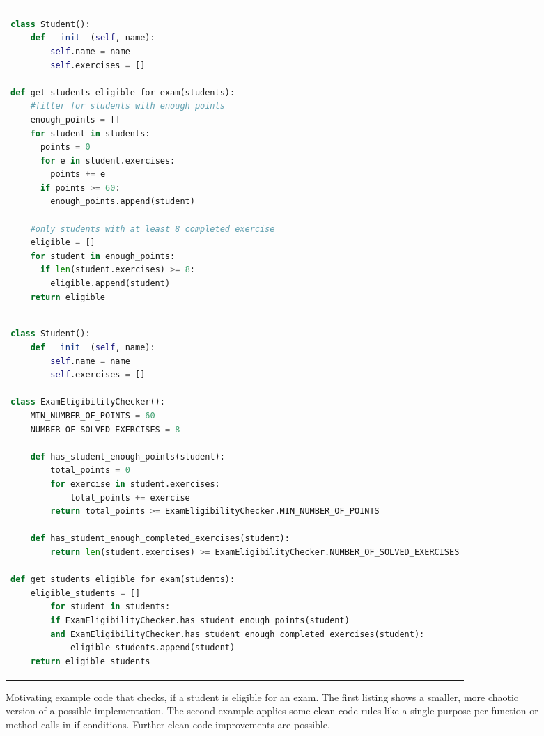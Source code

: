 \begin{figure}[h]
\begin{tabular}{p{\textwidth}}
\begin{minipage}{1\textwidth}
\centering
\begin{lstlisting}[basicstyle=\tiny, language=Python, label=lst:tokens_1, caption={}]
class Student():
    def __init__(self, name):
        self.name = name
        self.exercises = []

def get_students_eligible_for_exam(students):
    #filter for students with enough points
    enough_points = []
    for student in students:
      points = 0
      for e in student.exercises:
        points += e
      if points >= 60:
        enough_points.append(student)
    
    #only students with at least 8 completed exercise
    eligible = []
    for student in enough_points:
      if len(student.exercises) >= 8:
        eligible.append(student)
    return eligible
\end{lstlisting}
\end{minipage}
\\
\begin{minipage}[c]{1\textwidth}
\centering
\begin{lstlisting}[basicstyle=\tiny, language=Python, label=lst:tokens_2, caption={}]
class Student():
    def __init__(self, name):
        self.name = name
        self.exercises = []
    
class ExamEligibilityChecker():
    MIN_NUMBER_OF_POINTS = 60
    NUMBER_OF_SOLVED_EXERCISES = 8
    
    def has_student_enough_points(student):
        total_points = 0
        for exercise in student.exercises:
            total_points += exercise
        return total_points >= ExamEligibilityChecker.MIN_NUMBER_OF_POINTS
    
    def has_student_enough_completed_exercises(student):
        return len(student.exercises) >= ExamEligibilityChecker.NUMBER_OF_SOLVED_EXERCISES

def get_students_eligible_for_exam(students):
    eligible_students = []
        for student in students:
        if ExamEligibilityChecker.has_student_enough_points(student) 
        and ExamEligibilityChecker.has_student_enough_completed_exercises(student):
            eligible_students.append(student)
    return eligible_students    
\end{lstlisting}
\end{minipage}
\end{tabular}
\caption{Motivating example code that checks, if a student is eligible for an exam. The first listing shows a smaller, more chaotic version of a possible implementation. The second example applies some clean code rules like a single purpose per function or method calls in if-conditions. Further clean code improvements are possible.}
\label{list:motivating_example}
\end{figure}


